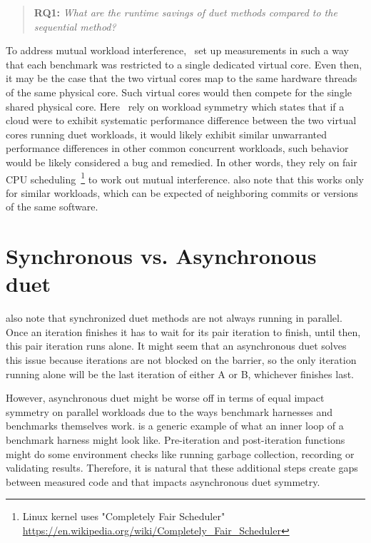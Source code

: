 \begin{quote}
	\textbf{RQ1:} \emph{What are the runtime savings of duet methods compared to the sequential method?}
\end{quote}

To address mutual workload interference,~\citet{bulej2020duet} set up measurements in such a way that each benchmark was restricted to a single dedicated virtual core.
Even then, it may be the case that the two virtual cores map to the same hardware threads of the same physical core.
Such virtual cores would then compete for the single shared physical core.
Here~\citet{bulej2019initial} rely on workload symmetry which states that if a cloud were to exhibit systematic performance difference between the two virtual cores running duet workloads, it would likely exhibit similar unwarranted performance differences in other common concurrent workloads, such behavior would be likely considered a bug and remedied.
In other words, they rely on fair CPU scheduling~\footnote{Linux kernel uses "Completely Fair Scheduler" \url{https://en.wikipedia.org/wiki/Completely_Fair_Scheduler}} to work out mutual interference.
\citet{bulej2019initial} also note that this works only for similar workloads, which can be expected of neighboring commits or versions of the same software.


\section{Synchronous vs. Asynchronous duet}

 also note that synchronized duet methods are not always running in parallel.
Once an iteration finishes it has to wait for its pair iteration to finish, until then, this pair iteration runs alone.
It might seem that an asynchronous duet solves this issue because iterations are not blocked on the barrier, so the only iteration running alone will be the last iteration of either A or B, whichever finishes last.

However, asynchronous duet might be worse off in terms of equal impact symmetry on parallel workloads due to the ways benchmark harnesses and benchmarks themselves work.
 is a generic example of what an inner loop of a benchmark harness might look like.
Pre-iteration and post-iteration functions might do some environment checks like running garbage collection, recording or validating results.
Therefore, it is natural that these additional steps create gaps between measured code and that impacts asynchronous duet symmetry.

